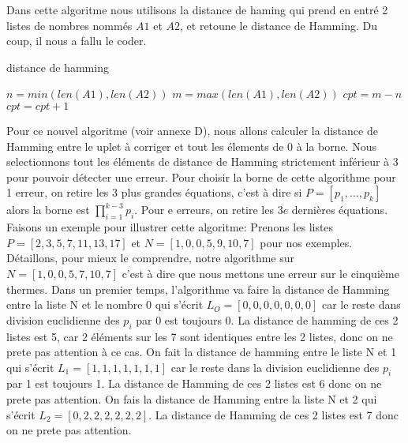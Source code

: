 \documentclass[a4paper, 11pt]{report}
\begin{document}
Dans cette algoritme nous utilisons la distance de haming qui prend en entré 2 listes de nombres nommés $A1$ et $A2$, et retoune le distance de Hamming. Du coup, il nous a fallu le coder. \newline
\begin{algorithm}
    \caption{distance de hamming}
    \begin{algorithmic}
        \STATE $n=min(len(A1),len(A2))$
        \STATE $m=max(len(A1),len(A2))$
        \STATE $cpt=m-n$
        \STATE $cpt=cpt+1$
        \ENDIF
        \ENDFOR
    \end{algorithmic}
\end{algorithm}

Pour ce nouvel algoritme (voir annexe D), nous allons calculer la distance de Hamming entre le uplet à corriger et tout les élements de 0 à la borne. Nous selectionnons tout les éléments de distance de Hamming strictement inférieur à 3 pour pouvoir détecter une erreur. \newline
Pour choisir la borne de cette algorithme pour 1 erreur, on retire les 3 plus grandes équations, c'est à dire si $P=[p_1, ..., p_k]$ alors la borne est $\prod_{i=1} ^{k-3} p_i$. Pour e erreurs, on retire les $3e$ dernières équations. \newline
Faisons un exemple pour illustrer cette algoritme: \newline
Prenons les listes $P=[2,3,5,7,11,13,17]$ et $N=[1,0,0,5,9,10,7]$ pour nos exemples. \newline
Détaillons, pour mieux le comprendre, notre algorithme sur $N=[1,0,0,5,7,10,7]$ c'est à dire que nous mettons une erreur sur le cinquième thermes.
Dans un premier temps, l'algorithme va faire la distance de Hamming entre la liste N et le nombre 0 qui s'écrit $L_O=[0,0,0,0,0,0,0]$ car le reste dans division euclidienne des $p_i$ par 0 est toujours 0.
La distance de hamming de ces 2 listes est 5, car 2 éléments sur les 7 sont identiques entre les 2 listes, donc on ne prete pas attention à ce cas. \newline
On fait la distance de hamming entre le liste N et 1 qui s'écrit $L_1=[1,1,1,1,1,1,1]$ car le reste dans la division euclidienne des $p_i$ par 1 est toujours 1.
La distance de Hamming de ces 2 listes est 6 donc on ne prete pas attention.
On fais la distance de Hamming entre la liste N et 2 qui s'écrit $L_2=[0,2,2,2,2,2,2]$. La distance de Hamming de ces 2 listes est 7 donc on ne prete pas attention. \newline
\end{document}
